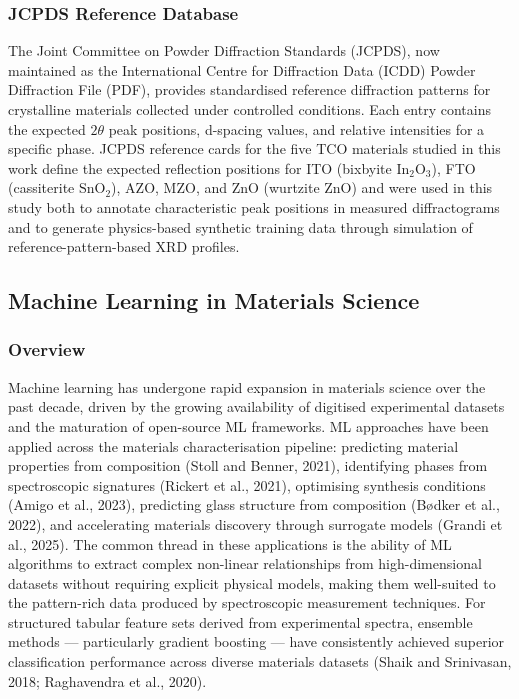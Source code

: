 \documentclass[12pt, oneside]{article} %
\begin{document}
\subsubsection{JCPDS Reference Database}

The Joint Committee on Powder Diffraction Standards (JCPDS), now maintained as the International Centre for Diffraction Data (ICDD) Powder Diffraction File (PDF), provides standardised reference diffraction patterns for crystalline materials collected under controlled conditions. Each entry contains the expected $2\theta$ peak positions, d-spacing values, and relative intensities for a specific phase. JCPDS reference cards for the five TCO materials studied in this work define the expected reflection positions for ITO (bixbyite $\text{In}_2\text{O}_3$), FTO (cassiterite $\text{SnO}_2$), AZO, MZO, and ZnO (wurtzite ZnO) and were used in this study both to annotate characteristic peak positions in measured diffractograms and to generate physics-based synthetic training data through simulation of reference-pattern-based XRD profiles.


\subsection{Machine Learning in Materials Science}

\subsubsection{Overview}

Machine learning has undergone rapid expansion in materials science over the past decade, driven by the growing availability of digitised experimental datasets and the maturation of open-source ML frameworks. ML approaches have been applied across the materials characterisation pipeline: predicting material properties from composition (Stoll and Benner, 2021), identifying phases from spectroscopic signatures (Rickert et al., 2021), optimising synthesis conditions (Amigo et al., 2023), predicting glass structure from composition (B{\o}dker et al., 2022), and accelerating materials discovery through surrogate models (Grandi et al., 2025). The common thread in these applications is the ability of ML algorithms to extract complex non-linear relationships from high-dimensional datasets without requiring explicit physical models, making them well-suited to the pattern-rich data produced by spectroscopic measurement techniques. For structured tabular feature sets derived from experimental spectra, ensemble methods --- particularly gradient boosting --- have consistently achieved superior classification performance across diverse materials datasets (Shaik and Srinivasan, 2018; Raghavendra et al., 2020).
\end{document}
